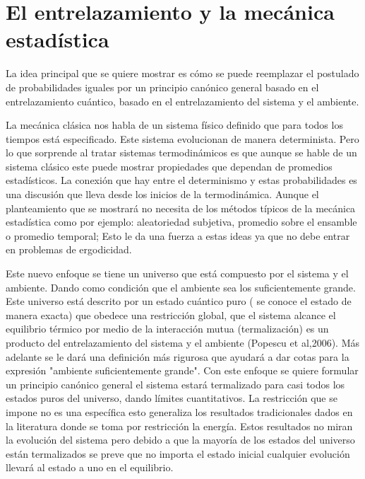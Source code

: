 \chapter{El entrelazamiento y la mecánica estadística}

La idea principal que se quiere mostrar es cómo se puede reemplazar el postulado de probabilidades iguales por un principio canónico general basado en el entrelazamiento cuántico, basado en el entrelazamiento del sistema y el ambiente.

La mecánica clásica nos habla de un sistema físico definido que para todos los tiempos está especificado. Este sistema evolucionan de manera determinista. Pero lo que sorprende al tratar sistemas termodinámicos es que aunque se hable de un sistema clásico este puede mostrar propiedades que dependan de promedios estadísticos. La conexión que hay entre el determinismo y estas probabilidades es una discusión que lleva desde los inicios de la termodinámica. Aunque el planteamiento que se mostrará no necesita de los métodos típicos de la mecánica estadística como por ejemplo: aleatoriedad subjetiva, promedio sobre el ensamble o promedio temporal; Esto le da una fuerza a estas ideas ya que no debe entrar en problemas de ergodicidad. 

Este nuevo enfoque se tiene un universo que está compuesto por el sistema y el ambiente. Dando como condición que el ambiente sea los suficientemente grande. Este universo está descrito por un estado cuántico puro ( se conoce el estado de manera exacta) que obedece una restricción global, que el sistema alcance el equilibrio térmico por medio de la interacción mutua (termalización) es un producto del entrelazamiento del sistema y el ambiente (Popescu et al,2006). Más adelante se le dará una definición más rigurosa que ayudará a dar cotas para la expresión "ambiente suficientemente grande". Con este enfoque se quiere formular un principio canónico general  el sistema estará termalizado para casi todos los estados puros del universo, dando límites cuantitativos. La restricción que se impone no es una específica esto generaliza los resultados tradicionales dados en la literatura donde se toma por restricción la energía. %
Estos resultados no miran la evolución del sistema pero debido a que la mayoría de los estados del universo están termalizados se preve que no importa el estado inicial cualquier evolución llevará al estado a uno en el equilibrio.


